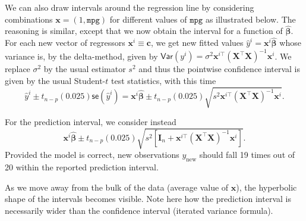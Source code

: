 \documentclass[]{book}
\newenvironment{Shaded}{\begin{snugshade}}{\end{snugshade}}
\newcommand{\CommentTok}[1]{\textcolor[rgb]{0.56,0.35,0.01}{\textit{#1}}}
\newcommand{\DataTypeTok}[1]{\textcolor[rgb]{0.13,0.29,0.53}{#1}}
\newcommand{\DecValTok}[1]{\textcolor[rgb]{0.00,0.00,0.81}{#1}}
\newcommand{\KeywordTok}[1]{\textcolor[rgb]{0.13,0.29,0.53}{\textbf{#1}}}
\newcommand{\NormalTok}[1]{#1}
\newcommand{\OperatorTok}[1]{\textcolor[rgb]{0.81,0.36,0.00}{\textbf{#1}}}
\newcommand{\OtherTok}[1]{\textcolor[rgb]{0.56,0.35,0.01}{#1}}
\newcommand{\StringTok}[1]{\textcolor[rgb]{0.31,0.60,0.02}{#1}}
\theoremstyle{definition}
\theoremstyle{definition}
\theoremstyle{definition}
\theoremstyle{remark}
\begin{document}
We can also draw intervals around the regression line by considering combinations \(\mathbf{x} = (1, \texttt{mpg})\) for different values of \(\texttt{mpg}\) as illustrated below. The reasoning is similar, except that we now obtain the interval for a function of \(\widehat{\boldsymbol{\beta}}\). For each new vector of regressors \(\mathbf{x}^i \equiv \mathbf{c}\), we get new fitted values \(\hat{y}^i= \mathbf{x}^i\widehat{\boldsymbol{\beta}}\) whose variance is, by the delta-method, given by \(\mathsf{Var}(y^i)={\sigma^2}\mathbf{x}^{i\top}(\mathbf{X}^\top\mathbf{X})^{-1}\mathbf{x}^i\). We replace \(\sigma^2\) by the usual estimator \(s^2\) and thus the pointwise confidence interval is given by the usual Student-\(t\) test statistics, with this time
\[\hat{y}^i \pm t_{n-p}({0.025})\mathsf{se}(\hat{y}^i) =  \mathbf{x}^i\widehat{\boldsymbol{\beta}} \pm t_{n-p}({0.025})\sqrt{s^2\mathbf{x}^{i\top}(\mathbf{X}^\top\mathbf{X})^{-1}\mathbf{x}^i}.\]

For the prediction interval, we consider instead
\[ \mathbf{x}^i\widehat{\boldsymbol{\beta}} \pm t_{n-p}({0.025})\sqrt{s^2 \left[ \mathbf{I}_n + \mathbf{x}^{i\top}(\mathbf{X}^\top\mathbf{X})^{-1}\mathbf{x}^i\right]}.\]
Provided the model is correct, new observations \(y_{\mathrm{new}}\) should fall 19 times out of 20 within the reported prediction interval.

As we move away from the bulk of the data (average value of \(\mathbf{x}\)), the hyperbolic shape of the intervals becomes visible. Note here how the prediction interval is necessarily wider than the confidence interval (iterated variance formula).

\begin{Shaded}
\end{Shaded}
\end{document}
